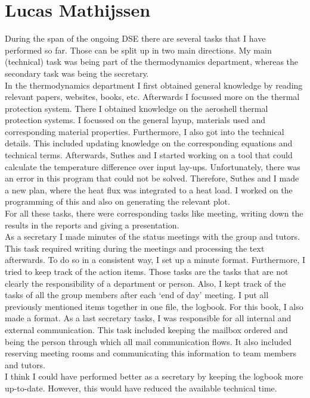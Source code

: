 \section{Lucas Mathijssen}
During the span of the ongoing DSE there are several tasks that I have performed so far. Those can be split up in two main directions. My main (technical) task was being part of the thermodynamics department, whereas the secondary task was being the secretary. \\

In the thermodynamics department I first obtained general knowledge by reading relevant papers, websites, books, etc. Afterwards I focussed more on the thermal protection system. There I obtained knowledge on the aeroshell thermal protection systems. I focussed on the general layup, materials used and corresponding material properties. Furthermore, I also got into the technical details. This included updating knowledge on the corresponding equations and technical terms. Afterwards, Suthes and I started working on a tool that could calculate the temperature difference over input lay-ups. Unfortunately, there was an error in this program that could not be solved. Therefore, Suthes and I made a new plan, where the heat flux was integrated to a heat load. I worked on the programming of this and also on generating the relevant plot. \\

For all these tasks, there were corresponding tasks like meeting, writing down the results in the reports and giving a presentation. \\

As a secretary I made minutes of the status meetings with the group and tutors. This task required writing during the meetings and processing the text afterwards. To do so in a consistent way, I set up a minute format. Furthermore, I tried to keep track of the action items. Those tasks are the tasks that are not clearly the responsibility of a department or person.  Also, I kept track of the tasks of all the group members after each ‘end of day’ meeting. I put all previously mentioned items together in one file, the logbook. For this book, I also made a format. As a last secretary tasks, I was responsible for all internal and external communication. This task included keeping the mailbox ordered and being the person through which all mail communication flows. It also included reserving meeting rooms and communicating this information to team members and tutors.\\

I think I could have performed better as a secretary by keeping the logbook more up-to-date. However, this would have reduced the available technical time.\\
